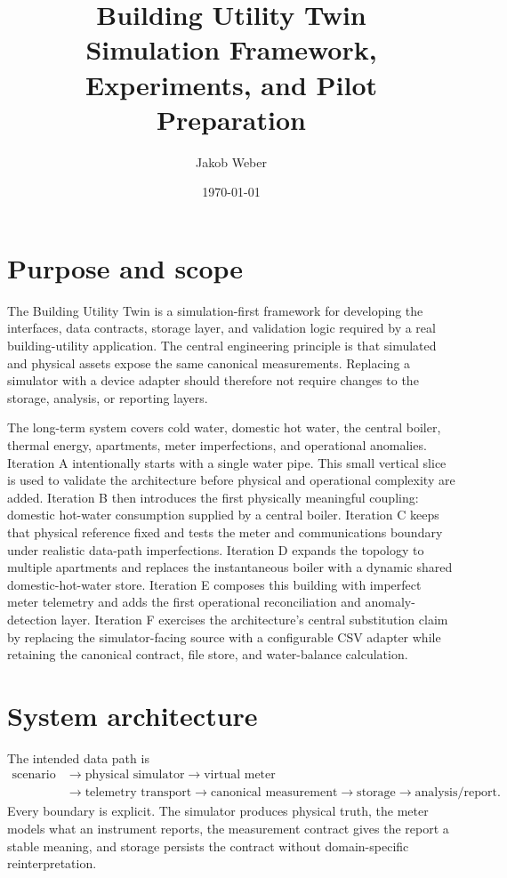 \documentclass[11pt,a4paper]{article}
\title{Building Utility Twin\\\large Simulation Framework, Experiments, and Pilot Preparation}
\author{Jakob Weber}
\date{\today}
\begin{document}
\maketitle
\tableofcontents

\section{Purpose and scope}
The Building Utility Twin is a simulation-first framework for developing the
interfaces, data contracts, storage layer, and validation logic required by a
real building-utility application. The central engineering principle is that
simulated and physical assets expose the same canonical measurements. Replacing
a simulator with a device adapter should therefore not require changes to the
storage, analysis, or reporting layers.

The long-term system covers cold water, domestic hot water, the central boiler,
thermal energy, apartments, meter imperfections, and operational anomalies.
Iteration A intentionally starts with a single water pipe. This small vertical
slice is used to validate the architecture before physical and operational
complexity are added. Iteration B then introduces the first physically meaningful
coupling: domestic hot-water consumption supplied by a central boiler.
Iteration C keeps that physical reference fixed and tests the meter and
communications boundary under realistic data-path imperfections.
Iteration D expands the topology to multiple apartments and replaces the
instantaneous boiler with a dynamic shared domestic-hot-water store.
Iteration E composes this building with imperfect meter telemetry and adds the
first operational reconciliation and anomaly-detection layer.
Iteration F exercises the architecture's central substitution claim by replacing
the simulator-facing source with a configurable CSV adapter while retaining the
canonical contract, file store, and water-balance calculation.

\section{System architecture}
The intended data path is
\begin{equation}
  \begin{aligned}
  \text{scenario} &\rightarrow \text{physical simulator}
  \rightarrow \text{virtual meter} \\
  &\rightarrow \text{telemetry transport}
  \rightarrow \text{canonical measurement}
  \rightarrow \text{storage} \rightarrow \text{analysis/report}.
  \end{aligned}
\end{equation}
Every boundary is explicit. The simulator produces physical truth, the meter
models what an instrument reports, the measurement contract gives the report a
stable meaning, and storage persists the contract without domain-specific
reinterpretation.
\end{document}
